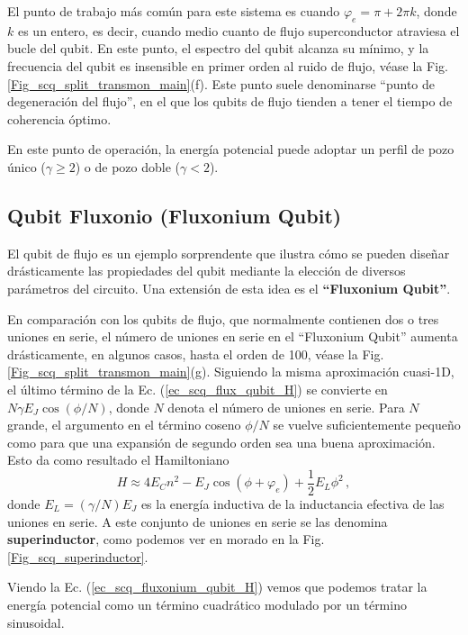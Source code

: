      El punto de trabajo más común para este sistema es cuando $\varphi_e = \pi + 2 \pi k$, donde $k$ es un entero, es decir, cuando medio cuanto de flujo superconductor atraviesa el bucle del qubit. En este punto, el espectro del qubit alcanza su mínimo, y la frecuencia del qubit es insensible en primer orden al ruido de flujo, véase la Fig. \ref{Fig_scq_split_transmon_main}(f). Este punto suele denominarse ``punto de degeneración del flujo'', en el que los qubits de flujo tienden a tener el tiempo de coherencia óptimo.
    
     En este punto de operación, la energía potencial puede adoptar un perfil de pozo único ($\gamma \geq 2$) o de pozo doble ($\gamma < 2$).




    \subsection{Qubit Fluxonio (Fluxonium Qubit)} \label{sec_scq_fluxonium_qubit}

    El qubit de flujo es un ejemplo sorprendente que ilustra cómo se pueden diseñar drásticamente las propiedades del qubit mediante la elección de diversos parámetros del circuito. Una extensión de esta idea es el \textbf{``Fluxonium Qubit''}. 

    En comparación con los qubits de flujo, que normalmente contienen dos o tres uniones en serie, el número de uniones en serie en el ``Fluxonium Qubit'' aumenta drásticamente, en algunos casos, hasta el orden de 100, véase la Fig. \ref{Fig_scq_split_transmon_main}(g). Siguiendo la misma aproximación cuasi-1D, el último término de la Ec. (\ref{ec_scq_flux_qubit_H}) se convierte en $N \gamma E_J \cos (\phi/N)$, donde $N$ denota el número de uniones en serie. Para $N$ grande, el argumento en el término coseno $\phi/N$ se vuelve suficientemente pequeño como para que una expansión de segundo orden sea una buena aproximación. Esto da como resultado el Hamiltoniano
    \begin{equation} \label{ec_scq_fluxonium_qubit_H}
        H \approx 4 E_C n^2 - E_J \cos (\phi + \varphi_e) + \frac{1}{2} E_L \phi^2\,,
    \end{equation}
    donde $E_L = (\gamma/N)E_J$ es la energía inductiva de la inductancia efectiva de las uniones en serie. A este conjunto de uniones en serie se las denomina \textbf{superinductor}, como podemos ver en morado en la Fig. \ref{Fig_scq_superinductor}.

    Viendo la Ec. (\ref{ec_scq_fluxonium_qubit_H}) vemos que podemos tratar la energía potencial como un término cuadrático modulado por un término sinusoidal.

